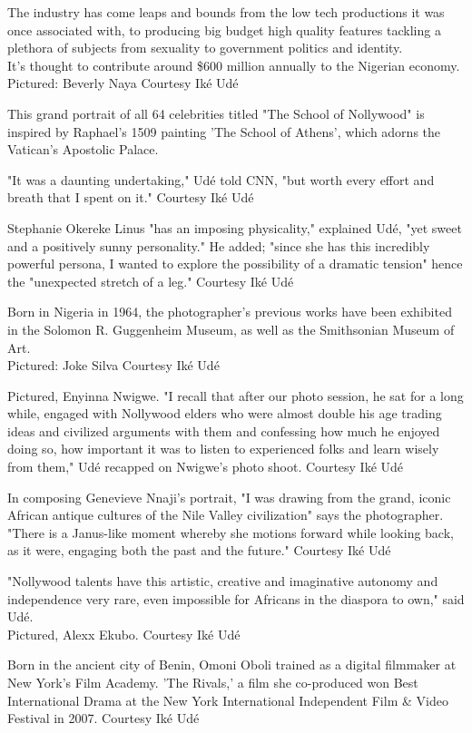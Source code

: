 The industry has come leaps and bounds from the low tech productions it
was once associated with, to producing big budget high quality features
tackling a plethora of subjects from sexuality to government politics
and identity.\\
It's thought to contribute around \$600 million annually to the Nigerian
economy.\\
Pictured: Beverly Naya Courtesy Iké Udé

This grand portrait of all 64 celebrities titled "The School of
Nollywood" is inspired by Raphael's 1509 painting 'The School of
Athens', which adorns the Vatican's Apostolic Palace.

"It was a daunting undertaking," Udé told CNN, "but worth every effort
and breath that I spent on it." Courtesy Iké Udé

Stephanie Okereke Linus "has an imposing physicality," explained Udé,
"yet sweet and a positively sunny personality." He added; "since she has
this incredibly powerful persona, I wanted to explore the possibility of
a dramatic tension" hence the "unexpected stretch of a leg." Courtesy
Iké Udé

Born in Nigeria in 1964, the photographer's previous works have been
exhibited in the Solomon R. Guggenheim Museum, as well as the
Smithsonian Museum of Art.\\
Pictured: Joke Silva Courtesy Iké Udé

Pictured, Enyinna Nwigwe. "I recall that after our photo session, he sat
for a long while, engaged with Nollywood elders who were almost double
his age trading ideas and civilized arguments with them and confessing
how much he enjoyed doing so, how important it was to listen to
experienced folks and learn wisely from them," Udé recapped on Nwigwe's
photo shoot. Courtesy Iké Udé

In composing Genevieve Nnaji's portrait, "I was drawing from the grand,
iconic African antique cultures of the Nile Valley civilization" says
the photographer. "There is a Janus-like moment whereby she motions
forward while looking back, as it were, engaging both the past and the
future." Courtesy Iké Udé

"Nollywood talents have this artistic, creative and imaginative autonomy
and independence very rare, even impossible for Africans in the diaspora
to own," said Udé.\\
Pictured, Alexx Ekubo. Courtesy Iké Udé

Born in the ancient city of Benin, Omoni Oboli trained as a digital
filmmaker at New York's Film Academy. 'The Rivals,' a film she
co-produced won Best International Drama at the New York International
Independent Film \& Video Festival in 2007. Courtesy Iké Udé


